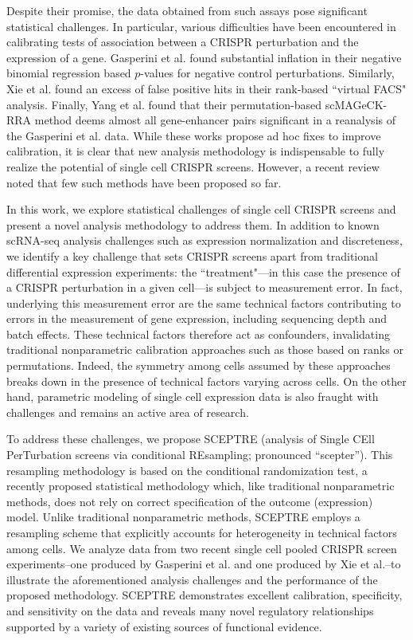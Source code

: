 \documentclass{nature}
\begin{document}
Despite their promise, the data obtained from such assays pose significant statistical challenges. In particular, various difficulties have been encountered in calibrating tests of association between a CRISPR perturbation and the expression of a gene. Gasperini et al.\cite{Gasperini2019} found substantial inflation in their negative binomial regression based $p$-values for negative control perturbations. Similarly, Xie et al.\cite{Xie2019} found an excess of false positive hits in their rank-based ``virtual FACS" analysis. Finally, Yang et al.\cite{Yang2020} found that their permutation-based scMAGeCK-RRA method deems almost all gene-enhancer pairs significant in a reanalysis of the Gasperini et al. data. While these works propose ad hoc fixes to improve calibration, it is clear that new analysis methodology is indispensable to fully realize the potential of single cell CRISPR screens. However, a recent review\cite{Lin2020} noted that few such methods have been proposed so far. 

In this work, we explore statistical challenges of single cell CRISPR screens and present a novel analysis methodology to address them. In addition to known scRNA-seq analysis challenges such as expression normalization and discreteness,\cite{Townes2019,Hafemeister2019,Svensson2020} we identify a key challenge that sets CRISPR screens apart from traditional differential expression experiments: the ``treatment"---in this case the presence of a CRISPR perturbation in a given cell---is subject to measurement error.\cite{Dixit2016,Hill2018,Replogle2020} In fact, underlying this measurement error are the same technical factors contributing to errors in the measurement of gene expression, including sequencing depth and batch effects. These technical factors therefore act as confounders, invalidating traditional nonparametric calibration approaches such as those based on ranks or permutations. Indeed, the symmetry among cells assumed by these approaches breaks down in the presence of technical factors varying across cells. On the other hand, parametric modeling of single cell expression data is also fraught with challenges and remains an active area of research.

To address these challenges, we propose SCEPTRE (analysis of Single CEll PerTurbation screens via conditional REsampling; pronounced ``scepter''). This resampling methodology is based on the conditional randomization test,\cite{CetL16} a recently proposed statistical methodology which, like traditional nonparametric methods, does not rely on correct specification of the outcome (expression) model. Unlike traditional nonparametric methods, SCEPTRE employs a resampling scheme that explicitly accounts for heterogeneity in technical factors among cells. We analyze data from two recent single cell pooled CRISPR screen experiments--one produced by Gasperini et al.\cite{Gasperini2019} and one produced by Xie et al.\cite{Xie2019}--to illustrate the aforementioned analysis challenges and the performance of the proposed methodology. SCEPTRE demonstrates excellent calibration, specificity, and sensitivity on the data and reveals many novel regulatory relationships supported by a variety of existing sources of functional evidence.
\end{document}
